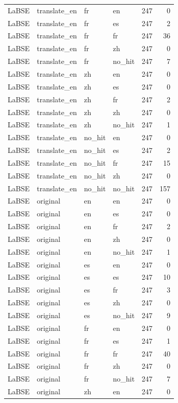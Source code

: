 \begin{tabular}{llllrr}
LaBSE & translate\_en & fr & en & 247 & 0 \\
LaBSE & translate\_en & fr & es & 247 & 2 \\
LaBSE & translate\_en & fr & fr & 247 & 36 \\
LaBSE & translate\_en & fr & zh & 247 & 0 \\
LaBSE & translate\_en & fr & no\_hit & 247 & 7 \\
LaBSE & translate\_en & zh & en & 247 & 0 \\
LaBSE & translate\_en & zh & es & 247 & 0 \\
LaBSE & translate\_en & zh & fr & 247 & 2 \\
LaBSE & translate\_en & zh & zh & 247 & 0 \\
LaBSE & translate\_en & zh & no\_hit & 247 & 1 \\
LaBSE & translate\_en & no\_hit & en & 247 & 0 \\
LaBSE & translate\_en & no\_hit & es & 247 & 2 \\
LaBSE & translate\_en & no\_hit & fr & 247 & 15 \\
LaBSE & translate\_en & no\_hit & zh & 247 & 0 \\
LaBSE & translate\_en & no\_hit & no\_hit & 247 & 157 \\
LaBSE & original & en & en & 247 & 0 \\
LaBSE & original & en & es & 247 & 0 \\
LaBSE & original & en & fr & 247 & 2 \\
LaBSE & original & en & zh & 247 & 0 \\
LaBSE & original & en & no\_hit & 247 & 1 \\
LaBSE & original & es & en & 247 & 0 \\
LaBSE & original & es & es & 247 & 10 \\
LaBSE & original & es & fr & 247 & 3 \\
LaBSE & original & es & zh & 247 & 0 \\
LaBSE & original & es & no\_hit & 247 & 9 \\
LaBSE & original & fr & en & 247 & 0 \\
LaBSE & original & fr & es & 247 & 1 \\
LaBSE & original & fr & fr & 247 & 40 \\
LaBSE & original & fr & zh & 247 & 0 \\
LaBSE & original & fr & no\_hit & 247 & 7 \\
LaBSE & original & zh & en & 247 & 0 \\

\end{tabular}

